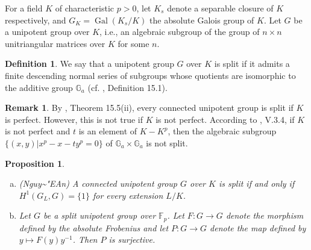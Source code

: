 \documentclass[10pt,a4paper]{amsart}
\newcommand{\ecircumflex}{\char"EA}
\numberwithin{equation}{section}
\theoremstyle{plain}
\newtheorem{prop}[theo]{Proposition}
\theoremstyle{definition}
\newtheorem{defi}[theo]{Definition}
\newtheorem{rema}[theo]{Remark}
\begin{document}
For a field $K$ of characteristic $p>0$, let $K_s$ denote a separable closure of $K$ respectively, and $G_K=\operatorname{Gal}(K_s/K)$ the absolute Galois group of $K$. Let $G$ be a unipotent group over $K$, i.e., an algebraic subgroup of the group of $n\times n$ unitriangular matrices over $K$ for some $n$. 

\begin{defi}
  We say that a unipotent group $G$ over $K$ is split if it admits a finite descending normal series of subgroups whose quotients are isomorphic to the additive group $\mathbb{G}_a$ (cf. \cite{Bo}, Definition 15.1).
\end{defi}

\begin{rema}
  By \cite{Bo}, Theorem 15.5(ii), every connected unipotent group is split if $K$ is perfect. However, this is not true if $K$ is not perfect. According to \cite{Oe}, V.3.4, if $K$ is not perfect and $t$ is an element of $K-K^p$, then the algebraic subgroup $\{(x,y)|x^p-x-ty^p=0\}$ of $\mathbb{G}_a\times\mathbb{G}_a$ is not split.
\end{rema}

\begin{prop}\label{lq}
\begin{enumerate}[(a)]
  \item\label{lq-1} ({\selectfont Nguy\~\ecircumflex{}n}) \cite{Ng} A connected unipotent group $G$ over $K$ is split if and only if $H^1(G_L,G)=\{1\}$ for every extension $L/K$.
  \item\label{lq-2} Let $G$ be a split unipotent group over $\mathbb{F}_p$. Let $F:G\to G$ denote the morphism defined by the absolute Frobenius and let $P:G\to G$ denote the map defined by $y\mapsto F(y)y^{-1}$. Then $P$ is surjective.
 \end{enumerate}
\end{prop}
\end{document}
